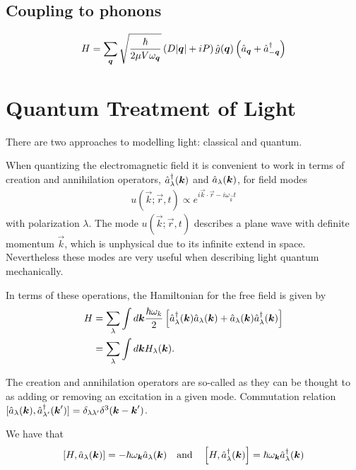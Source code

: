 \subsection{Coupling to phonons}

\begin{align}
  H = \sum_{{\boldsymbol{q}}} \sqrt{\frac{\hbar}{2\mu V\omega_{{\boldsymbol{q}}}}} \left(D \vert {\boldsymbol{q}}\vert + iP \right)\hat{g}({\boldsymbol{q}})\left(\hat{a}_{{\boldsymbol{q}}} + \hat{a}^\dagger_{-{\boldsymbol{q}}} \right)
\end{align}



\section{Quantum Treatment of Light}

There are two approaches to modelling light: classical and quantum. 

When quantizing the electromagnetic field it is convenient to work in terms of creation and annihilation operators, $\hat{a}^\dagger_\lambda({\boldsymbol{k}})$ and $\hat{a}_\lambda({\boldsymbol{k}})$, for field modes
\begin{align}
  u(\vec{k}; \vec{r}, t) \propto e^{i\vec{k} \cdot \vec{r} - i\omega_\vec{k} t}
\end{align}
with polarization $\lambda$. The mode $u(\vec{k}; \vec{r}, t)$ describes a plane wave with definite momentum $\vec{k}$, which is unphysical due to its infinite extend in space. Nevertheless these modes are very useful when describing light quantum mechanically.

In terms of these operations, the Hamiltonian for the free field is given by
\begin{align}
  H &= \sum_\lambda \int d{\boldsymbol{k}} \frac{\hbar\omega_k}{2} \left[ \hat{a}^\dagger_\lambda({\boldsymbol{k}})\hat{a}_\lambda({\boldsymbol{k}}) + \hat{a}_\lambda({\boldsymbol{k}})\hat{a}^\dagger_\lambda({\boldsymbol{k}}) \right] \\
  &= \sum_\lambda \int d{\boldsymbol{k}} H_\lambda({\boldsymbol{k}}).
\end{align}

The creation and annihilation operators are so-called as they can be thought to as adding or removing an excitation in a given mode. Commutation relation $[\hat{a}_\lambda({\boldsymbol{k}}), \hat{a}^\dagger_{\lambda '}({\boldsymbol{k}}')]  = \delta_{\lambda\lambda '}\delta^3({\boldsymbol{k}} - {\boldsymbol{k}}') $.

We have that
\begin{align}
  \left[H, \hat{a}_\lambda({\boldsymbol{k}})\right] = -\hbar \omega_{{\boldsymbol{k}}} \hat{a}_\lambda({\boldsymbol{k}})
  \quad \text{and} \quad 
  \left[H, \hat{a}^\dagger_\lambda({\boldsymbol{k}})\right] = \hbar \omega_{{\boldsymbol{k}}} \hat{a}^\dagger_\lambda({\boldsymbol{k}})
\end{align}

